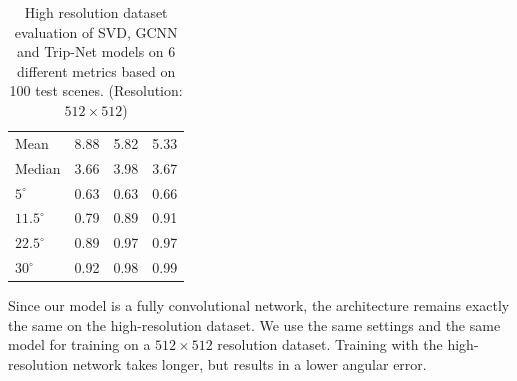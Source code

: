 \begin{table}[H]
	\centering
	\captionsetup{width=\linewidth}
	\begin{tabular}{l | l l l }
		\toprule
		\tabhead{Metrics} & \tabhead{SVD} & \tabhead{GCNN} & \tabhead{Trip-Net} \\
		\midrule
		Mean  					& 8.88 & 5.82 & 5.33 \\ 
		\hline
		Median					& 3.66 & 3.98 & 3.67 \\ 
		\hline
		$ 5^\circ $ 			& 0.63 & 0.63 & 0.66 \\
		\hline
		$ 11.5^\circ $ 			& 0.79 & 0.89 & 0.91 \\
		\hline
		$ 22.5^\circ $ 			& 0.89 & 0.97 & 0.97 \\
		\hline
		$ 30^\circ $ 			& 0.92 & 0.98 & 0.99 \\
		\bottomrule
	\end{tabular}
	\caption{High resolution dataset evaluation of SVD, GCNN and Trip-Net models on 6 different metrics based on 100 test scenes. (Resolution: $ 512\times512 $)}	
	\label{tab:high_resolution_eval}
\end{table}

Since our model is a fully convolutional network, the architecture remains exactly the same on the high-resolution dataset. We use the same settings and the same model for training on a $ 512\times512 $ resolution dataset. Training with the high-resolution network takes longer, but results in a lower angular error. 



